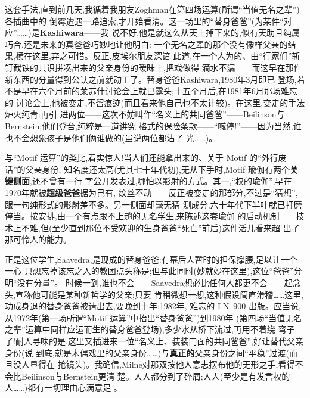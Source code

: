 这套手法,直到前几天,我循着我朋友Zoghman在第四场运算(所谓“当值无名之辈”)各插曲中的
倒霉遭遇一路追索,才开始看清。这一场里的“替身爸爸”(为某件“对应”……)是\textbf{Kashiwara}——我
说不好,他是就这么从天上掉下来的,\dmark{}似有天助且纯属巧合,还是未来的真爸爸巧妙地让他明白:
一个无名之辈的那个没有像样父亲的结果,横在这里,弃之可惜。反正,皮埃尔朋友深谙
此道,在一个人为的、由“行家们”斩钉截铁的共识拼凑出来的父亲身份的暧昧上,把戏做得
滴水不漏——而这早在那件新东西的分量得到公认之前就动工了。替身爸爸Kashiwara,1980年3月即已
登场,若不是早在六个月前的莱苏什讨论会上就已露头;十五个月后,在1981年6月那场难忘的
讨论会上,他被变走,不留痕迹(而且看来他自己也不太计较)。在这里,变走的手法炉火纯青:再引
进两位——这次不妨叫作“名义上的共同爸爸”——Beilinson与Bernstein;他们登台,纯粹是一道讲究
格式的保险条款——“喊停!”——因为当然,谁也不会想象孩子是他们俩谁做的(虽说两位都沾了
光……)。

与“Motif 运算”的类比,着实惊人!当人们还能拿出来的、关于 Motif 的“外行废话”的父亲身份,
知名度还太高(尤其七十年代初),无从下手时,Motif 瑜伽有两个\textbf{关键侧面},还不曾有一行
字公开发表过,哪怕以影射的方式。其一,“权的瑜伽”,早在1970年就被\textbf{超级爸爸}据为己有,
纹丝不动——反正被变走的那部分,不过是“猜想”,跟一句纯形式的影射差不多。另一侧面却毫无猜
测成分,六十年代下半叶就已打磨停当。按安排,由一个有点跟不上趟的无名学生,来陈述这套瑜伽
的启动机制——技术上不难,但(至少直到那位不受欢迎的生身爸爸“死亡”前后)这件活儿看来超
出了那可怜人的能力。

\pmark{}正是这位学生,Saavedra,是现成的替身爸爸:有幕后人暂时的担保撑腰,足以让一个一心
只想忘掉该忘之人的教团点头称是;但与此同时(妙就妙在这里),这位“爸爸”分明“没有分量”。
时候一到,谁也不会——Saavedra想必比任何人都更不会——起念头,宣称他可能是某种新哲学的父亲;只要
肯稍微想一想,这种假设简直滑稽……这里,功成身退的替身爸爸被请出去,要晚到十年:1982年,
难忘的 LN~900 出版。应当说,从1972年(第一场所谓“Motif 运算”中抬出“替身爸爸”)到1980年
(第四场“当值无名之辈”运算中同样应运而生的替身爸爸登场),多少水从桥下流过,再用不着绕
弯子了!耐人寻味的是,这里又插进来一位“名义上、装装门面的共同爸爸”,好让替代父亲身份(说
到底,就是木偶戏里的父亲身份……)与\textbf{真正的}父亲身份之间“平稳”过渡(而且没人显得在
抢镜头)。我确信,Milne对那双按他人意志摆布他的无形之手,看得不会比Beilinson与Bernstein更清
楚。人人都分到了碎屑;人人(至少是有发言权的人……)都有一切理由心满意足
。

